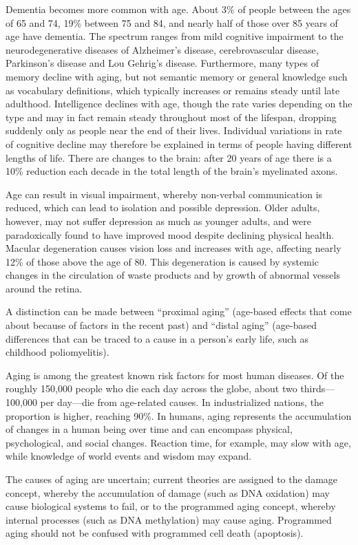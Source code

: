 Dementia becomes more common with age. About 3\% of people between the ages of 65 and 74, 19\% between 75 and 84, and nearly half of those over 85 years of age have dementia. The spectrum ranges from mild cognitive impairment to the neurodegenerative diseases of Alzheimer's disease, cerebrovascular disease, Parkinson's disease and Lou Gehrig's disease. Furthermore, many types of memory decline with aging, but not semantic memory or general knowledge such as vocabulary definitions, which typically increases or remains steady until late adulthood. Intelligence declines with age, though the rate varies depending on the type and may in fact remain steady throughout most of the lifespan, dropping suddenly only as people near the end of their lives. Individual variations in rate of cognitive decline may therefore be explained in terms of people having different lengths of life. There are changes to the brain: after 20 years of age there is a 10\% reduction each decade in the total length of the brain's myelinated axons.

Age can result in visual impairment, whereby non-verbal communication is reduced, which can lead to isolation and possible depression. Older adults, however, may not suffer depression as much as younger adults, and were paradoxically found to have improved mood despite declining physical health. Macular degeneration causes vision loss and increases with age, affecting nearly 12\% of those above the age of 80. This degeneration is caused by systemic changes in the circulation of waste products and by growth of abnormal vessels around the retina.

A distinction can be made between ``proximal aging'' (age-based effects that come about because of factors in the recent past) and ``distal aging'' (age-based differences that can be traced to a cause in a person's early life, such as childhood poliomyelitis).

Aging is among the greatest known risk factors for most human diseases. Of the roughly 150,000 people who die each day across the globe, about two thirds---100,000 per day---die from age-related causes. In industrialized nations, the proportion is higher, reaching 90\%.
In humans, aging represents the accumulation of changes in a human being over time and can encompass physical, psychological, and social changes. Reaction time, for example, may slow with age, while knowledge of world events and wisdom may expand.

The causes of aging are uncertain; current theories are assigned to the damage concept, whereby the accumulation of damage (such as DNA oxidation) may cause biological systems to fail, or to the programmed aging concept, whereby internal processes (such as DNA methylation) may cause aging. Programmed aging should not be confused with programmed cell death (apoptosis).

